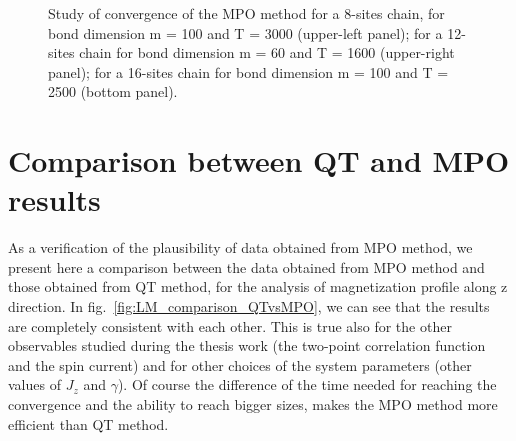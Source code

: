\begin{figure}[H]
\captionsetup{width=1.\linewidth}
\caption{Study of convergence of the MPO method for a 8-sites chain, for bond dimension m = 100 and T = 3000 (upper-left panel); for a 12-sites chain for bond dimension m = 60 and T = 1600 (upper-right panel); for a 16-sites chain for bond dimension m = 100 and T = 2500 (bottom panel).}
\label{fig:convergence_8_12_16}
\end{figure}


\section{Comparison between QT and MPO results}
As a verification of the plausibility of data obtained from MPO method, we present here a comparison between the data obtained from MPO method and those obtained from QT method, for the analysis of magnetization profile along z direction. In fig.~\ref{fig:LM_comparison_QTvsMPO}, we can see that the results are completely consistent with each other. This is true also for the other observables studied during the thesis work (the two-point correlation function and the spin current) and for other choices of the system parameters (other values of $J_z$ and $\gamma$). Of course the difference of the time needed for reaching the convergence and the ability to reach bigger sizes, makes the MPO method more efficient than QT method.

